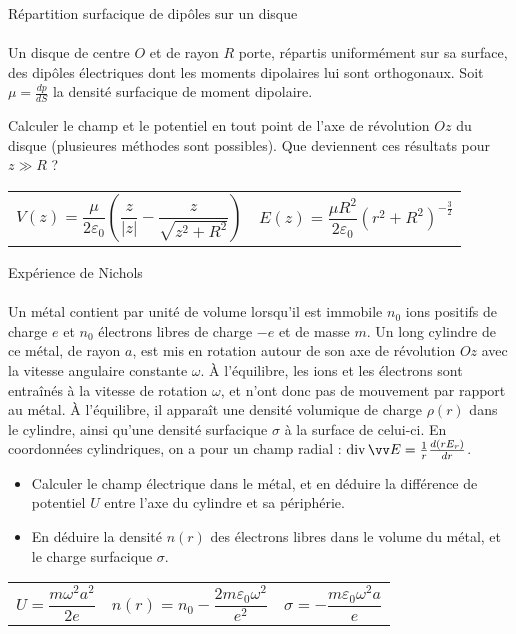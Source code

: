 \documentclass[french, a4paper, 11pt]{article}
\newcommand{\po}{\left(}         %
\newcommand{\pf}{\right)}        %
\newcommand{\pof}[1]{\po #1 \pf} %
\DeclareMathOperator{\diverg}{div}        %
\begin{document}
\begin{cadre}{Répartition surfacique de dipôles sur un disque}
  \paragraph*{}
  Un disque de centre $O$ et de rayon $R$ porte, répartis uniformément sur sa surface, des dipôles électriques dont les moments dipolaires lui sont orthogonaux. Soit $\mu = \frac{dp}{dS}$ la densité surfacique de moment dipolaire.

  Calculer le champ et le potentiel en tout point de l'axe de révolution $Oz$ du disque (plusieures méthodes sont possibles). Que deviennent ces résultats pour $z\gg R$ ?
  \tcblower
  \begin{tabularx}{\linewidth}{Xr}
    $V(z) = \dfrac{\mu}{2\varepsilon_{0}}\pof{\dfrac{z}{\lvert z\rvert}-\dfrac{z}{\sqrt{z^{2}+R^{2}}}}$ &
    $E(z) = \dfrac{\mu R^{2}}{2\varepsilon_{0}}\pof{r^{2}+R^{2}}^{-\frac{3}{2}}$
  \end{tabularx}
\end{cadre}

\begin{cadre}{Expérience de Nichols}
  \paragraph*{}
  Un métal contient par unité de volume lorsqu'il est immobile $n_{0}$ ions positifs de charge $e$ et $n_{0}$ électrons libres de charge $-e$ et de masse $m$. Un long cylindre de ce métal, de rayon $a$, est mis en rotation autour de son axe de révolution $Oz$ avec la vitesse angulaire constante $\omega$. À l'équilibre, les ions et les électrons sont entraînés à la vitesse de rotation $\omega$, et n'ont donc pas de mouvement par rapport au métal. À l'équilibre, il apparaît une densité volumique de charge $\rho(r)$ dans le cylindre, ainsi qu'une densité surfacique $\sigma$ à la surface de celui-ci. En coordonnées cylindriques, on a pour un champ radial : $\diverg \vv E = \frac{1}{r}\frac{d(rE_{r})}{dr}$.
  \begin{itemize}[label=$\bullet$]
    \item Calculer le champ électrique dans le métal, et en déduire la différence de potentiel $U$ entre l'axe du cylindre et sa périphérie.
    \item En déduire la densité $n(r)$ des électrons libres dans le volume du métal, et le charge surfacique $\sigma$.
  \end{itemize}
  \tcblower
  \begin{tabularx}{\linewidth}{XXr}
    $U = \dfrac{m\omega^{2}a^{2}}{2e}$ &
    $n(r) = n_{0} - \dfrac{2m\varepsilon_{0}\omega^{2}}{e^{2}}$ &
    $\sigma = -\dfrac{m\varepsilon_{0}\omega^{2}a}{e}$
  \end{tabularx}
\end{cadre}
\end{document}
